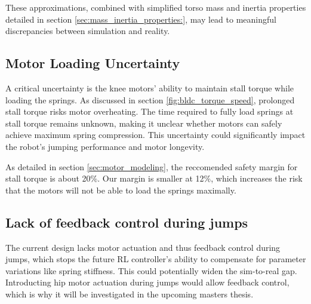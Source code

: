 These approximations, combined with simplified torso mass and inertia properties detailed in section \ref{sec:mass_inertia_properties:}, may lead to meaningful discrepancies between simulation and reality.

\subsection{Motor Loading Uncertainty}
A critical uncertainty is the knee motors' ability to maintain stall torque while loading the springs. As discussed in section \ref{fig:bldc_torque_speed}, prolonged stall torque risks motor overheating. The time required to fully load springs at stall torque remains unknown, making it unclear whether motors can safely achieve maximum spring compression. This uncertainty could significantly impact the robot's jumping performance and motor longevity.

As detailed in section \ref{sec:motor_modeling}, the reccomended safety margin for stall torque is about 20\%. Our margin is smaller at 12\%, which increases the risk that the motors will not be able to load the springs maximally.

\subsection{Lack of feedback control during jumps}
The current design lacks motor actuation and thus feedback control during jumps, which stops the future RL controller's ability to compensate for parameter variations like spring stiffness. This could potentially widen the sim-to-real gap. Introducting hip motor actuation during jumps would allow feedback control, which is why it will be investigated in the upcoming masters thesis.


